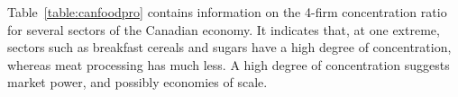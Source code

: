 Table~\ref{table:canfoodpro} contains information on the 4-firm
concentration ratio for several sectors of the Canadian economy. It
indicates that, at one extreme, sectors such as breakfast cereals and sugars
have a high degree of concentration, whereas meat processing has much less.
A high degree of concentration suggests market power, and possibly economies
of scale.